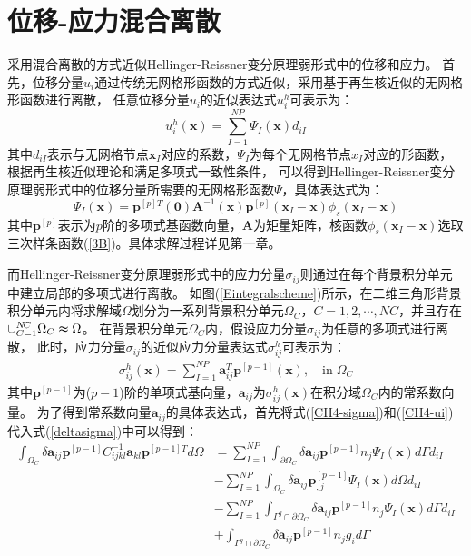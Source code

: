 \section{位移-应力混合离散}
采用混合离散的方式近似Hellinger-Reissner变分原理弱形式中的位移和应力。
首先，位移分量$u_i$通过传统无网格形函数的方式近似，采用基于再生核近似的无网格形函数进行离散，
任意位移分量$u_i$的近似表达式$u^h_i$可表示为：
\begin{equation}\label{CH4-ui}
    u^h_i(\pmb{x})=\sum_{I=1}^{N\!P}\Psi_I(\pmb{x})d_{iI}
\end{equation}
其中$d_{iI}$表示与无网格节点$\pmb{x}_I$对应的系数，$\Psi_I$为每个无网格节点$x_I$对应的形函数，根据再生核近似理论和满足多项式一致性条件，
可以得到Hellinger-Reissner变分原理弱形式中的位移分量所需要的无网格形函数$\Psi$，具体表达式为：
\begin{equation}
    \Psi_I(\pmb{x})=\pmb{p}^{[p]T}(\pmb{0})\pmb{A}^{-1}(\pmb{x})\pmb{p}^{[p]}(\pmb{x}_I-\pmb{x})\phi_s(\pmb{x}_I-\pmb{x})
\end{equation}
其中$\pmb{p}^{[p]}$表示为$p$阶的多项式基函数向量，$\pmb{A}$为矩量矩阵，核函数$\phi_s(\pmb{x}_I-\pmb{x})$选取三次样条函数(\ref{3B})。具体求解过程详见第一章。\par
而Hellinger-Reissner变分原理弱形式中的应力分量$\sigma_{ij}$则通过在每个背景积分单元中建立局部的多项式进行离散。
如图(\ref{Eintegralscheme})所示，在二维三角形背景积分单元内将求解域$\Omega$划分为一系列背景积分单元$\Omega_C$，$C=1,2,\dotsb,N\!C$，并且存在$\cup_{C=1}^{N\!C}\Omega_C\thickapprox\Omega$。
在背景积分单元$\Omega_C$内，假设应力分量$\sigma_{ij}$为任意的多项式进行离散，
此时，应力分量$\sigma_{ij}$的近似应力分量表达式$\sigma^h_{ij}$可表示为：
\begin{equation}\label{CH4-sigma}
\begin{split}
    \sigma^h_{ij}(\pmb{x})=\sum_{I=1}^{N\!P}\pmb{a}_{ij}^T\pmb{p}^{[p-1]}(\pmb{x}),\quad\text{in}\;\Omega_C
\end{split}
\end{equation}
其中$\pmb{p}^{[p-1]}$为($p-1$)阶的单项式基向量，$\pmb{a}_{ij}$为$\sigma_{ij}^h(\pmb{x})$在积分域$\Omega_C$内的常系数向量。
为了得到常系数向量$\pmb{a}_{ij}$的具体表达式，首先将式(\ref{CH4-sigma})和(\ref{CH4-ui})代入式(\ref{deltasigma})中可以得到：
\begin{equation}
\begin{split}
    \int_{\Omega_C}\delta\pmb{a}_{ij}\pmb{p}^{[p-1]}C^{-1}_{ijkl}\pmb{a}_{kl}\pmb{p}^{[p-1]T}d\Omega&=\sum_{I=1}^{N\!P}\int_{\partial\Omega_C}\delta\pmb{a}_{ij}\pmb{p}^{[p-1]}n_j\Psi_I(\pmb{x})d\Gamma d_{iI}\\
    &-\sum_{I=1}^{N\!P}\int_{\Omega_C}\delta\pmb{a}_{ij}\pmb{p}_{,j}^{[p-1]}\Psi_{I}(\pmb{x})d\Omega d_{iI}\\
     &-\sum_{I=1}^{N\!P}\int_{\Gamma^g\cap\partial\Omega_C}\delta\pmb{a}_{ij}\pmb{p}^{[p-1]}n_j\Psi_I(\pmb{x})d\Gamma d_{iI}\\
     &+\int_{\Gamma^g\cap\partial\Omega_C}\delta\pmb{a}_{ij}\pmb{p}^{[p-1]}n_jg_id\Gamma
\end{split}
\end{equation}

